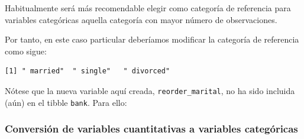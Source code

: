 \documentclass[
  letterpaper,
  DIV=11,
  numbers=noendperiod]{scrreprt}
\newenvironment{Shaded}{\begin{snugshade}}{\end{snugshade}}
\newcommand{\AttributeTok}[1]{\textcolor[rgb]{0.40,0.45,0.13}{#1}}
\newcommand{\FunctionTok}[1]{\textcolor[rgb]{0.28,0.35,0.67}{#1}}
\newcommand{\NormalTok}[1]{\textcolor[rgb]{0.00,0.23,0.31}{#1}}
\newcommand{\OtherTok}[1]{\textcolor[rgb]{0.00,0.23,0.31}{#1}}
\newcommand{\SpecialCharTok}[1]{\textcolor[rgb]{0.37,0.37,0.37}{#1}}
\newcommand{\StringTok}[1]{\textcolor[rgb]{0.13,0.47,0.30}{#1}}
\begin{document}
\begin{tcolorbox}[enhanced jigsaw, arc=.35mm, breakable, coltitle=black, left=2mm, opacityback=0, bottomtitle=1mm, colbacktitle=quarto-callout-warning-color!10!white, title=\textcolor{quarto-callout-warning-color}{\faExclamationTriangle}\hspace{0.5em}{Recomendación}, titlerule=0mm, colback=white, colframe=quarto-callout-warning-color-frame, bottomrule=.15mm, rightrule=.15mm, opacitybacktitle=0.6, toptitle=1mm, toprule=.15mm, leftrule=.75mm]

Habitualmente será más recomendable elegir como categoría de referencia
para variables categóricas aquella categoría con mayor número de
observaciones.

\end{tcolorbox}

Por tanto, en este caso particular deberíamos modificar la categoría de
referencia como sigue:

\begin{Shaded}
\end{Shaded}

\begin{verbatim}
[1] " married"  " single"   " divorced"
\end{verbatim}

Nótese que la nueva variable aquí creada, \texttt{reorder\_marital}, no
ha sido incluida (aún) en el tibble \texttt{bank}. Para ello:

\begin{Shaded}
\end{Shaded}

\hypertarget{conversiuxf3n-de-variables-cuantitativas-a-variables-categuxf3ricas}{%
\subsubsection{Conversión de variables cuantitativas a variables
categóricas}\label{conversiuxf3n-de-variables-cuantitativas-a-variables-categuxf3ricas}}
\end{document}
